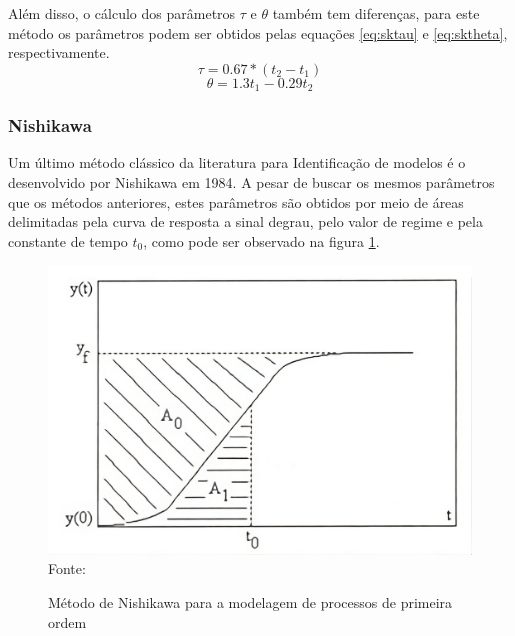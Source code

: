 Além disso, o cálculo dos parâmetros $\tau$ e $\theta$ também tem diferenças,
para este método os parâmetros podem ser obtidos pelas equações \eqref{eq:sktau} e
\eqref{eq:sktheta}, respectivamente.
\begin{equation}
    \label{eq:sktau}
    \tau = 0.67*(t_2 - t_1)
\end{equation}
\begin{equation}
    \label{eq:sktheta}
    \theta = 1.3t_1 - 0.29t_2
\end{equation}

\subsubsection{Nishikawa}\label{subsubsec:nkfun}

Um último método clássico da literatura para Identificação de modelos é o desenvolvido por Nishikawa em 1984.
A pesar de buscar os mesmos parâmetros que os métodos anteriores, estes parâmetros são obtidos por meio de áreas
delimitadas pela curva de resposta a sinal degrau, pelo valor de regime e pela constante de tempo $t_0$, como pode ser
observado na figura \ref{fig:ni_ident_meth}.


\begin{figure}[H]
    \centering
    \caption{Método de Nishikawa para a modelagem de processos de primeira ordem}
    \includegraphics[scale=0.3]{figuras/ni_ident_meth}
    \label{fig:ni_ident_meth}
    \\
    \vspace{0cm}\hspace{0cm}\small{Fonte: \cite{CoelhoIdentificacao}}
\end{figure}

